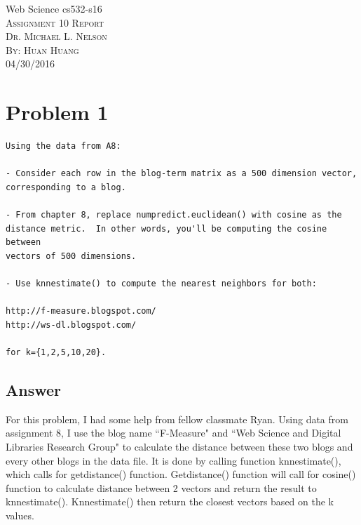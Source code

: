 \documentclass[12pt]{article}
\begin{document}
\begin{titlepage}
	\begin{center}
	\Huge{Web Science cs532-s16}\\
	[0.25in]
	\textsc{\Large Assignment 10 Report}\\
	\textsc{\normalsize Dr. Michael L. Nelson}\\
	[4.25in]
	\textsc{\normalsize By: Huan Huang}\\
	\large 04/30/2016\\
	
	
	\end{center}
\end{titlepage}
\newpage



\section*{Problem 1}


\begin{verbatim}
Using the data from A8:

- Consider each row in the blog-term matrix as a 500 dimension vector, 
corresponding to a blog.  

- From chapter 8, replace numpredict.euclidean() with cosine as the 
distance metric.  In other words, you'll be computing the cosine between
vectors of 500 dimensions.  

- Use knnestimate() to compute the nearest neighbors for both:

http://f-measure.blogspot.com/
http://ws-dl.blogspot.com/

for k={1,2,5,10,20}.
\end{verbatim}

\subsection*{Answer}
For this problem, I had some help from fellow classmate Ryan. Using data from assignment 8, I use the blog name ``F-Measure" and ``Web Science and Digital Libraries Research Group" to calculate the distance between these two blogs and every other blogs in the data file. It is done by calling function knnestimate(), which calls for getdistance() function. Getdistance() function will call for cosine() function to calculate distance between 2 vectors and return the result to knnestimate(). Knnestimate() then return the closest vectors based on the k values.
\end{document}
